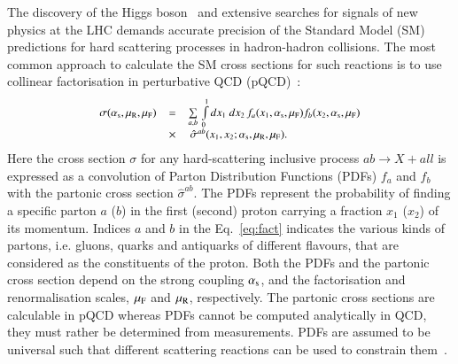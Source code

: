 The discovery of the Higgs boson~\cite{Aad:2012tfa,Chatrchyan:2012ufa}
and extensive searches for signals of new physics at the LHC demands accurate precision of the Standard Model (SM) predictions for
hard scattering processes in hadron-hadron collisions.
The most common approach to calculate the SM cross sections for  
such reactions is to use collinear factorisation in perturbative QCD (pQCD)~\cite{Collins:1989}:
\begin{equation}
\small
\begin{array}{lcl}
\sigma(\alpha_\mathrm{s},\mu_\mathrm{R},\mu_\mathrm{F}) & = &
\sum\limits_{a,b}\,  \int\limits_{0}\limits^{1} dx_1\ dx_2\, f_a(x_1,\alpha_\mathrm{s},\mu_\mathrm{F}) 
 f_b(x_2,\alpha_\mathrm{s},\mu_\mathrm{F})\\ 
& \times & \, \hat{\sigma}^{ab}(x_1,x_2;\alpha_\mathrm{s},\mu_\mathrm{R},\mu_\mathrm{F}).
\label{eq:fact}
\end{array}
\end{equation}
Here the cross section $\sigma$ for 
any hard-scattering inclusive process $ab \rightarrow X + all$
is expressed
as a convolution of Parton Distribution Functions (PDFs) $f_a$ and $f_b$
with the partonic cross section
$\hat{\sigma}^{ab}$.
%
The PDFs represent 
the probability of finding a specific parton $a$ ($b$) in the first (second) proton carrying a fraction $x_1$ ($x_2$) of its momentum.
%
Indices $a$ and $b$ in the Eq.~\ref{eq:fact} indicates the various 
kinds of partons,
i.e. gluons, quarks and antiquarks of different flavours, 
that are considered
as the constituents of the proton.
%
Both the PDFs and the partonic cross section depend on the strong coupling
$\alpha_\mathrm{s}$, and the factorisation and renormalisation scales,
$\mu_\mathrm{F}$ and $\mu_\mathrm{R}$, respectively.
%
The partonic cross sections are calculable in pQCD whereas
PDFs cannot be computed analytically in QCD,
they must rather be determined from measurements. 
%
PDFs are assumed to be universal such that different scattering reactions can be used 
to constrain them~\cite{Perez:2012um,Forte:2013wc}.
%

